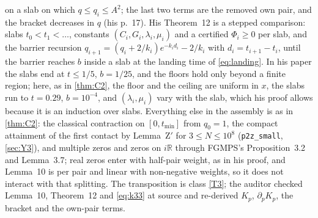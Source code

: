 \documentclass[11pt]{article}
\theoremstyle{definition}
\newcommand{\lean}[1]{\texttt{#1}}
\newcommand{\R}{\mathbb{R}}
\begin{document}
on a slab on which $q \le q_i \le A^2$; the last two terms are the removed own pair, and the bracket decreases in $q$ (his p.~17). His Theorem~12 is a stepped comparison: slabs $t_0 < t_1 < \dots$, constants $(C_i, G_i, \lambda_i, \mu_i)$ and a certified $\Phi_i \ge 0$ per slab, and the barrier recursion $q_{i+1} = (q_i + 2/k_i)e^{-k_id_i} - 2/k_i$ with $d_i = t_{i+1} - t_i$, until the barrier reaches $b$ inside a slab at the landing time of \eqref{eq:landing}. In his paper the slabs end at $t \le 1/5$, $b = 1/25$, and the floors hold only beyond a finite region; here, as in \cref{thm:C2}, the floor and the ceiling are uniform in $x$, the slabs run to $t = 0.29$, $b = 10^{-4}$, and $(\lambda_i, \mu_i)$ vary with the slab, which his proof allows because it is an induction over slabs. Everything else in the assembly is as in \cref{thm:C2}: the classical contraction on $[0, t_{\min}]$ from $q_0 = 1$, the compact attainment of the first contact by Lemma~Z$'$ for $3 \le N \le 10^8$ (\lean{p2z\_small}, \cref{sec:Y3}), and multiple zeros and zeros on $i\R$ through FGMPS's Proposition~3.2 and Lemma~3.7; real zeros enter with half-pair weight, as in his proof, and Lemma~10 is per pair and linear with non-negative weights, so it does not interact with that splitting. The transposition is class \ref{T3}; the auditor checked Lemma~10, Theorem~12 and \eqref{eq:k33} at source and re-derived $K_p$, $\partial_pK_p$, the bracket and the own-pair terms.
\end{document}
